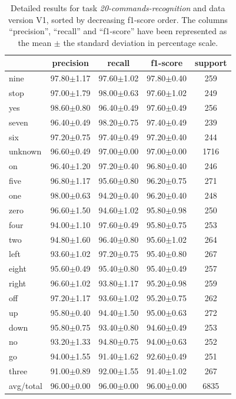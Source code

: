 \documentclass[review]{elsarticle}
\begin{document}
\begin{table} \centering \scriptsize
	\caption{Detailed results for task \textit{20-commands-recognition} and data version V1, sorted by decreasing f1-score order. The columns ``precision'', ``recall'' and ``f1-score'' have been represented as the mean $\pm$ the standard deviation in percentage scale. }
	\begin{tabular}{lcccc}
		\toprule
		{} &       precision &          recall &        f1-score & support \\
		\midrule
		nine      &  97.80$\pm$1.17 &  97.60$\pm$1.02 &  97.80$\pm$0.40 &     259 \\
		stop      &  97.00$\pm$1.79 &  98.00$\pm$0.63 &  97.60$\pm$1.02 &     249 \\
		yes       &  98.60$\pm$0.80 &  96.40$\pm$0.49 &  97.60$\pm$0.49 &     256 \\
		seven     &  96.40$\pm$0.49 &  98.20$\pm$0.75 &  97.40$\pm$0.49 &     239 \\
		six       &  97.20$\pm$0.75 &  97.40$\pm$0.49 &  97.20$\pm$0.40 &     244 \\
		unknown   &  96.60$\pm$0.49 &  97.00$\pm$0.00 &  97.00$\pm$0.00 &    1716 \\
		on        &  96.40$\pm$1.20 &  97.20$\pm$0.40 &  96.80$\pm$0.40 &     246 \\
		five      &  96.80$\pm$1.17 &  95.60$\pm$0.80 &  96.20$\pm$0.75 &     271 \\
		one       &  98.00$\pm$0.63 &  94.20$\pm$0.40 &  96.20$\pm$0.40 &     248 \\
		zero      &  96.60$\pm$1.50 &  94.60$\pm$1.02 &  95.80$\pm$0.98 &     250 \\
		four      &  94.00$\pm$1.10 &  97.60$\pm$0.49 &  95.80$\pm$0.75 &     253 \\
		two       &  94.80$\pm$1.60 &  96.40$\pm$0.80 &  95.60$\pm$1.02 &     264 \\
		left      &  93.60$\pm$1.02 &  97.20$\pm$0.75 &  95.40$\pm$0.80 &     267 \\
		eight     &  95.60$\pm$0.49 &  95.40$\pm$0.80 &  95.40$\pm$0.49 &     257 \\
		right     &  96.60$\pm$1.02 &  93.80$\pm$1.17 &  95.20$\pm$0.98 &     259 \\
		off       &  97.20$\pm$1.17 &  93.60$\pm$1.02 &  95.20$\pm$0.75 &     262 \\
		up        &  95.80$\pm$0.40 &  94.40$\pm$1.50 &  95.00$\pm$0.63 &     272 \\
		down      &  95.80$\pm$0.75 &  93.40$\pm$0.80 &  94.60$\pm$0.49 &     253 \\
		no        &  93.20$\pm$1.33 &  94.80$\pm$0.75 &  94.00$\pm$0.63 &     252 \\
		go        &  94.00$\pm$1.55 &  91.40$\pm$1.62 &  92.60$\pm$0.49 &     251 \\
		three     &  91.00$\pm$0.89 &  92.00$\pm$1.55 &  91.40$\pm$1.02 &     267 \\
		\midrule avg/total &  96.00$\pm$0.00 &  96.00$\pm$0.00 &  96.00$\pm$0.00 &    6835 \\
		\bottomrule
	\end{tabular}
	
\end{table}
\end{document}

